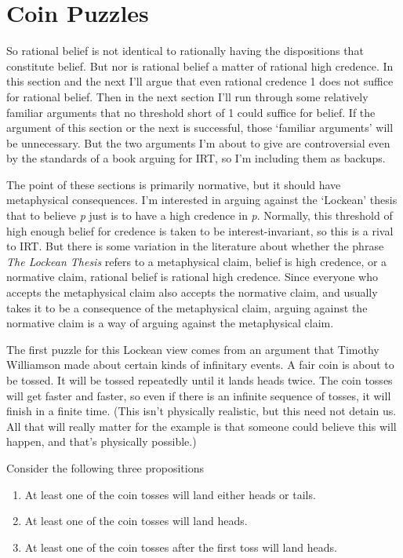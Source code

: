 \documentclass[
  11pt,
]{book}
\providecommand{\tightlist}{%
  \setlength{\itemsep}{0pt}\setlength{\parskip}{0pt}}
\begin{document}
\hypertarget{lockecoin}{%
\section{Coin Puzzles}\label{lockecoin}}

So rational belief is not identical to rationally having the dispositions that constitute belief. But nor is rational belief a matter of rational high credence. In this section and the next I'll argue that even rational credence 1 does not suffice for rational belief. Then in the next section I'll run through some relatively familiar arguments that no threshold short of 1 could suffice for belief. If the argument of this section or the next is successful, those `familiar arguments' will be unnecessary. But the two arguments I'm about to give are controversial even by the standards of a book arguing for IRT, so I'm including them as backups.

The point of these sections is primarily normative, but it should have metaphysical consequences. I'm interested in arguing against the `Lockean' thesis that to believe \emph{p} just is to have a high credence in \emph{p}. Normally, this threshold of high enough belief for credence is taken to be interest-invariant, so this is a rival to IRT. But there is some variation in the literature about whether the phrase \emph{The Lockean Thesis} refers to a metaphysical claim, belief is high credence, or a normative claim, rational belief is rational high credence. Since everyone who accepts the metaphysical claim also accepts the normative claim, and usually takes it to be a consequence of the metaphysical claim, arguing against the normative claim is a way of arguing against the metaphysical claim.

The first puzzle for this Lockean view comes from an argument that Timothy Williamson \citeyearpar{Williamson2007} made about certain kinds of infinitary events. A fair coin is about to be tossed. It will be tossed repeatedly until it lands heads twice. The coin tosses will get faster and faster, so even if there is an infinite sequence of tosses, it will finish in a finite time. (This isn't physically realistic, but this need not detain us. All that will really matter for the example is that someone could believe this will happen, and that's physically possible.)

Consider the following three propositions

\begin{enumerate}
\def\labelenumi{\Alph{enumi}.}
\tightlist
\item
  At least one of the coin tosses will land either heads or tails.
\item
  At least one of the coin tosses will land heads.
\item
  At least one of the coin tosses after the first toss will land heads.
\end{enumerate}
\end{document}
